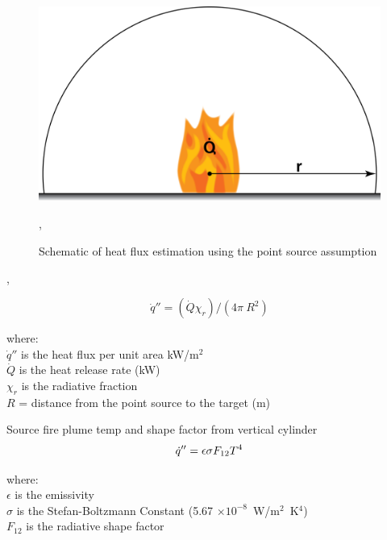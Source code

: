\documentclass[twoside]{uocthesis}
\begin{document}
\begin{figure}
	\centering
	\includegraphics[width=\textwidth]{../Figures/PointSourceHF}
	\caption{Schematic of heat flux estimation using the point source assumption}
	\label{PointSourceHF},
\end{figure},



\begin{equation} \label{eq:second_item}
\dot{q}'' = (\dot{Q} \chi_r)/(4 \pi\ R^2)
\end{equation}

\begin{tabbing}
where: \=  \\

\> $\dot{q}''$ is the heat flux per unit area kW/m$^2$\\
\> $\dot{Q}$ is the heat release rate (kW) \\ 
\> $\chi_r$ is the radiative fraction \\
\> $R$ = distance from the point source to the target (m) \\
\end{tabbing}

Source fire plume temp and shape factor from vertical cylinder
\begin{equation}\label{eq:source_fire}
\dot{q}'' = \epsilon \sigma F_{12} T^4  \\
\end{equation}

\begin{tabbing}
where: \=  \\
\> $\epsilon$ is the emissivity  \\
\> $\sigma$ is the Stefan-Boltzmann Constant (5.67 $\times 10^{−8}$~W/m$^2$~K$^4$)  \\
\> $F_{12}$ is the radiative shape factor \\
\end{tabbing}
\end{document}

